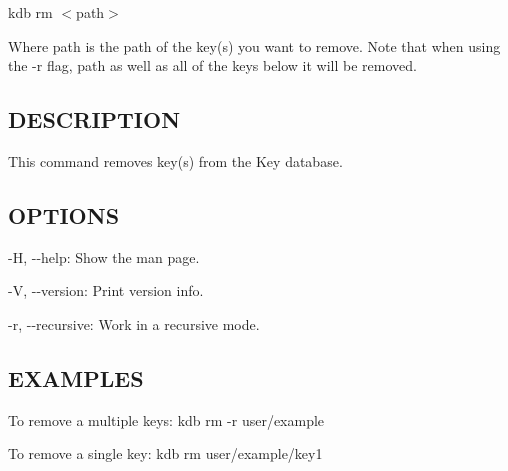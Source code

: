{\ttfamily kdb rm $<$path$>$}

Where {\ttfamily path} is the path of the key(s) you want to remove. Note that when using the {\ttfamily -\/r} flag, {\ttfamily path} as well as all of the keys below it will be removed.

\subsection*{D\+E\+S\+C\+R\+I\+P\+T\+I\+O\+N}

This command removes key(s) from the Key database.

\subsection*{O\+P\+T\+I\+O\+N\+S}


\begin{DoxyItemize}
\item {\ttfamily -\/\+H}, {\ttfamily -\/-\/help}\+: Show the man page.
\item {\ttfamily -\/\+V}, {\ttfamily -\/-\/version}\+: Print version info.
\item {\ttfamily -\/r}, {\ttfamily -\/-\/recursive}\+: Work in a recursive mode.
\end{DoxyItemize}

\subsection*{E\+X\+A\+M\+P\+L\+E\+S}

To remove a multiple keys\+: {\ttfamily kdb rm -\/r user/example}

To remove a single key\+: {\ttfamily kdb rm user/example/key1} 